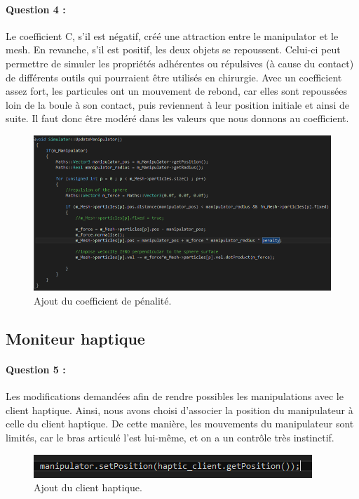 \documentclass[a4paper,12pt]{article}
\begin{document}
\newpage\paragraph{Question 4 :} Le coefficient C, s'il est négatif, créé une attraction entre le manipulator et le mesh. En revanche, s'il est positif, les deux objets se repoussent. Celui-ci peut permettre de simuler les propriétés adhérentes ou répulsives (à cause du contact) de différents outils qui pourraient être utilisés en chirurgie. Avec un coefficient assez fort, les particules ont un mouvement de rebond, car elles sont repoussées loin de la boule à son contact, puis reviennent à leur position initiale et ainsi de suite. Il faut donc être modéré dans les valeurs que nous donnons au coefficient.
\begin{figure}[ht!]
  \centering
  \includegraphics[width=\textwidth]{images/penalty.png}
  \caption{Ajout du coefficient de pénalité.}
  \label{fig:q4tp2}
\end{figure}

\subsection{Moniteur haptique}
\paragraph{Question 5 :} Les modifications demandées afin de rendre possibles les manipulations avec le client haptique. Ainsi, nous avons choisi d'associer la position du manipulateur à celle du client haptique. De cette manière, les mouvements du manipulateur sont limités, car le bras articulé l'est lui-même, et on a un contrôle très instinctif.
\begin{figure}[ht!]
  \centering
  \includegraphics{images/ajout_haptique.png}
  \caption{Ajout du client haptique.}
  \label{fig:q5tp2}
\end{figure}
\end{document}
